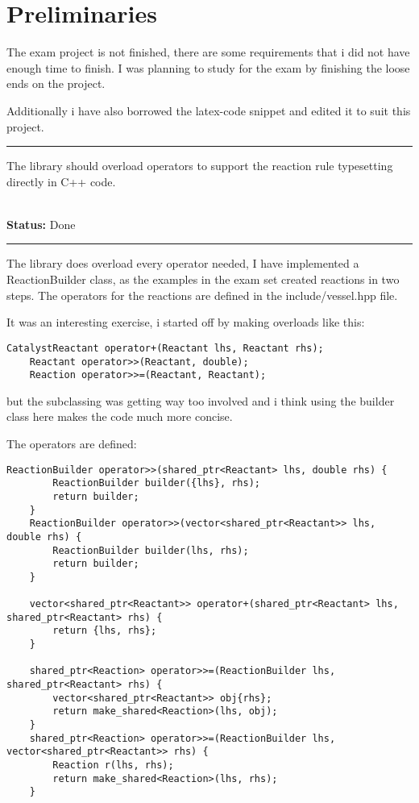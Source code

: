 \newcommand{\requirement}[2]{
    \newpage
    \hrule
    \vspace{10pt}
    {
        \large \noindent #1
    }\\
    \textbf{Status:} #2
    \vspace{10pt}
    \hrule
    \vspace{10pt}
}

\section{Preliminaries}
The exam project is not finished, there are some requirements that i did not have enough time to finish. I was planning to study for the exam by finishing the loose ends on the project.

Additionally i have also borrowed the latex-code snippet and edited it to suit this project.

\requirement{
    The library should overload operators to support the reaction rule typesetting directly in C++ code.
}{Done}
The library does overload every operator needed, I have implemented a ReactionBuilder class, as the examples in the exam set created reactions in two steps. The operators for the reactions are defined in the include/vessel.hpp file.

It was an interesting exercise, i started off by making overloads like this:

\begin{lstlisting}[style=colorC++]
    CatalystReactant operator+(Reactant lhs, Reactant rhs);
    Reactant operator>>(Reactant, double);
    Reaction operator>>=(Reactant, Reactant);
\end{lstlisting}

but the subclassing was getting way too involved and i think using the builder class here makes the code much more concise.

The operators are defined:

\begin{lstlisting}[style=colorC++]
    ReactionBuilder operator>>(shared_ptr<Reactant> lhs, double rhs) {
        ReactionBuilder builder({lhs}, rhs);
        return builder;
    }
    ReactionBuilder operator>>(vector<shared_ptr<Reactant>> lhs, double rhs) {
        ReactionBuilder builder(lhs, rhs);
        return builder;
    }

    vector<shared_ptr<Reactant>> operator+(shared_ptr<Reactant> lhs, shared_ptr<Reactant> rhs) {
        return {lhs, rhs};
    }

    shared_ptr<Reaction> operator>>=(ReactionBuilder lhs, shared_ptr<Reactant> rhs) {
        vector<shared_ptr<Reactant>> obj{rhs};
        return make_shared<Reaction>(lhs, obj);
    }
    shared_ptr<Reaction> operator>>=(ReactionBuilder lhs, vector<shared_ptr<Reactant>> rhs) {
        Reaction r(lhs, rhs);
        return make_shared<Reaction>(lhs, rhs);
    }
\end{lstlisting}

